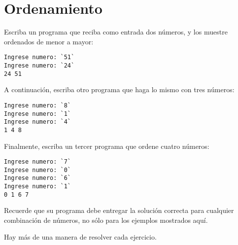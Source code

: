 \section{Ordenamiento}

Escriba un programa que reciba como entrada dos números, y los muestre
ordenados de menor a mayor:
%
\begin{lstlisting}[language=testcase]
Ingrese numero: `51`
Ingrese numero: `24`
24 51
\end{lstlisting}
%
A continuación, escriba otro programa que haga lo mismo con tres
números:
%
\begin{lstlisting}[language=testcase]
Ingrese numero: `8`
Ingrese numero: `1`
Ingrese numero: `4`
1 4 8
\end{lstlisting}
%
Finalmente, escriba un tercer programa que ordene cuatro números:
%
\begin{lstlisting}[language=testcase]
Ingrese numero: `7`
Ingrese numero: `0`
Ingrese numero: `6`
Ingrese numero: `1`
0 1 6 7
\end{lstlisting}

Recuerde que su programa debe entregar la solución correcta para
cualquier combinación de números, no sólo para los ejemplos mostrados
aquí.

Hay más de una manera de resolver cada ejercicio.
